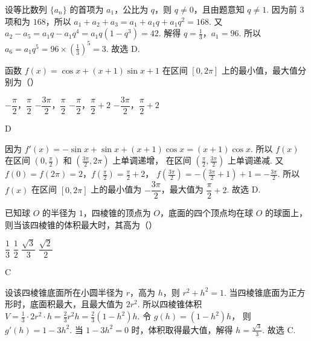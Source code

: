 \begin{solution}
设等比数列 \(\{a_n\}\) 的首项为 \(a_1\)，公比为 \(q\)，则 \(q\ne0\)，且由题意知 \(q\ne1\).
因为前 \(3\) 项和为 \(168\)，所以
\(a_1+a_2+a_3=a_1+a_1q+a_1q^2=168\).
又
\(a_2-a_5=a_1q-a_1q^4=a_1q(1-q^3)=42\).
解得
\(q=\frac13\)，\(a_1=96\).
所以
\(a_6=a_1q^5=96\times\left(\frac13\right)^5=3\).
故选 D.
\end{solution}

\begin{problem}
函数 \(f(x)=\cos x+(x+1)\sin x+1\) 在区间 \([0,2\pi]\) 上的最小值，最大值分别为（\quad）

\choices
    {\(-\dfrac{\pi}{2}\)，\(\dfrac{\pi}{2}\)}
    {\(-\dfrac{3\pi}{2}\)，\(\dfrac{\pi}{2}\)}
    {\(-\dfrac{\pi}{2}\)，\(\dfrac{\pi}{2}+2\)}
    {\(-\dfrac{3\pi}{2}\)，\(\dfrac{\pi}{2}+2\)}
\end{problem}

\begin{answer}
D
\end{answer}

\begin{solution}
因为
\(f'(x)=-\sin x+\sin x+(x+1)\cos x=(x+1)\cos x\).
所以 \(f(x)\) 在区间 \(\left(0,\frac{\pi}{2}\right)\) 和 \(\left(\frac{3\pi}{2},2\pi\right)\) 上单调递增，
在区间 \(\left(\frac{\pi}{2},\frac{3\pi}{2}\right)\) 上单调递减.
又
\(f(0)=f(2\pi)=2\)，\(f\left(\frac{\pi}{2}\right)=\frac{\pi}{2}+2\)，
\(f\left(\frac{3\pi}{2}\right)=-\left(\frac{3\pi}{2}+1\right)+1=-\frac{3\pi}{2}\).
所以 \(f(x)\) 在区间 \([0,2\pi]\) 上的最小值为 \(-\dfrac{3\pi}{2}\)，最大值为 \(\dfrac{\pi}{2}+2\).
故选 D.
\end{solution}

\begin{problem}
已知球 \(O\) 的半径为 \(1\)，四棱锥的顶点为 \(O\)，底面的四个顶点均在球 \(O\) 的球面上，则当该四棱锥的体积最大时，其高为（\quad）

\choices
    {\(\dfrac{1}{3}\)}
    {\(\dfrac{1}{2}\)}
    {\(\dfrac{\sqrt3}{3}\)}
    {\(\dfrac{\sqrt2}{2}\)}
\end{problem}

\begin{answer}
C
\end{answer}

\begin{solution}
设该四棱锥底面所在小圆半径为 \(r\)，高为 \(h\)，则
\(r^2+h^2=1\).
当四棱锥底面为正方形时，底面积最大，且最大值为
\(2r^2\).
所以四棱锥体积
\(V=\frac13\cdot2r^2\cdot h=\frac23r^2h=\frac23(1-h^2)h\).
令
\(g(h)=(1-h^2)h\)，
则
\(g'(h)=1-3h^2\).
当
\(1-3h^2=0\)
时，体积取得最大值，解得
\(h=\frac{\sqrt3}{3}\).
故选 C.
\end{solution}

